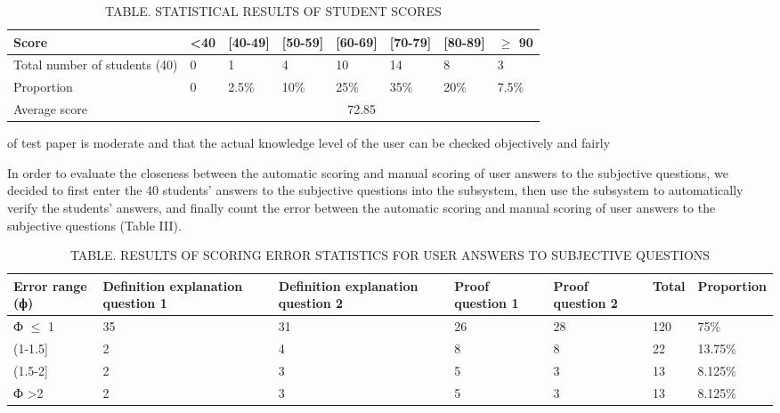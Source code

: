 \documentclass{article}
\begin{document}
\begin{multicols}{2}
\vspace{-0.6cm}

\begin{table}[H]
\caption{TABLE. STATISTICAL RESULTS OF STUDENT SCORES}
\begin{center}
\vspace{-0.3cm}
\begin{tabular}{|p{1.3cm}|p{0.5cm}|p{0.6cm}|p{0.7cm}|p{0.7cm}|p{0.7cm}|p{0.7cm}|p{0.75cm}|}
\hline
Score & \textless 40 & [40-49] & [50-59] & [60-69] & [70-79] & [80-89] & $\geq$ 90 \\
\hline
Total number of students (40) & 0 & 1 & 4 & 10 & 14 & 8 & 3 \\
\hline
\leftskip=-0.1cm \small{Proportion} & 0 & 2.5\% & 10\% & 25\% & 35\% & 20\% & 7.5\%\\
\hline
Average score & \multicolumn{7}{|c|}{72.85} \\
\hline
\end{tabular}
\end{center}
\end{table}
\noindent of test paper is moderate and that the actual knowledge
level of the user can be checked objectively and fairly

In order to evaluate the closeness between the automatic scoring and manual scoring of user answers to the subjective questions, we decided to first enter the 40 students’ answers to the subjective questions into the subsystem, then use the subsystem to automatically verify the students’ answers, and finally count the error between the automatic scoring and manual scoring of user answers to the subjective questions (Table III).
\begin{table}[H]
\caption{TABLE. RESULTS OF SCORING ERROR STATISTICS FOR USER ANSWERS TO SUBJECTIVE QUESTIONS}
\begin{center}
\vspace{-0.3cm}
\begin{tabular}{|p{1cm}|p{1cm}|p{1cm}|p{1cm}|p{1cm}|p{0.7cm}|p{1.1cm}|}
\hline
Error range (ф) & \hspace{-0.35cm} \small{Definition explanation question 1} & \hspace{-0.35cm} \small{Definition explanation question 2} & Proof question 1 & Proof question 2 & Total & \hspace{-0.4cm} \small Proportion\\
\hline
Ф $\leq$ 1 & 35 & 31 & 26 & 28 & 120 & 75\% \\
\hline
(1-1.5] & 2 & 4 & 8 & 8 & 22 & 13.75\%\\
\hline
(1.5-2] & 2 & 3 & 5 & 3 & 13 & 8.125\%\\
\hline
Ф \textgreater 2 & 2 & 3 & 5 & 3 & 13 & 8.125\%\\


\end{tabular}
\end{center}
\end{table}
\end{multicols}
\end{document}
